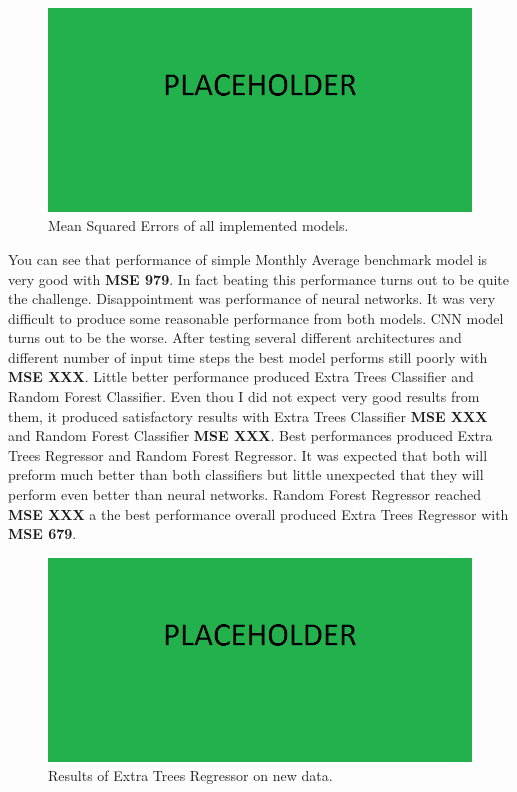 \documentclass{article}
\begin{document}
\begin{figure}[h!]
\centering
\includegraphics[width=16cm]{imgs/placeholder.png}
\caption{Mean Squared Errors of all implemented models.}
\label{fig:all_models_result}
\end{figure}

You can see that performance of simple Monthly Average benchmark model is very good with \textbf{MSE 979}. In fact beating this performance turns out to be quite the challenge. Disappointment was performance of neural networks. It was very difficult to produce some reasonable performance from both models. CNN model turns out to be the worse. After testing several different architectures and different number of input time steps the best model performs still poorly with \textbf{MSE XXX}. Little better performance produced Extra Trees Classifier and Random Forest Classifier. Even thou I did not expect very good results from them, it produced satisfactory results with Extra Trees Classifier \textbf{MSE XXX} and Random Forest Classifier \textbf{MSE XXX}. Best performances produced Extra Trees Regressor and Random Forest Regressor. It was expected that both will preform much better than both classifiers but little unexpected that they will perform even better than neural networks. Random Forest Regressor reached \textbf{MSE XXX} a the best performance overall produced Extra Trees Regressor with \textbf{MSE 679}.

\begin{figure}[h!]
\centering
\includegraphics[width=16cm]{imgs/placeholder.png}
\caption{Results of Extra Trees Regressor on new data.}
\label{fig:new_data}
\end{figure}
\end{document}
